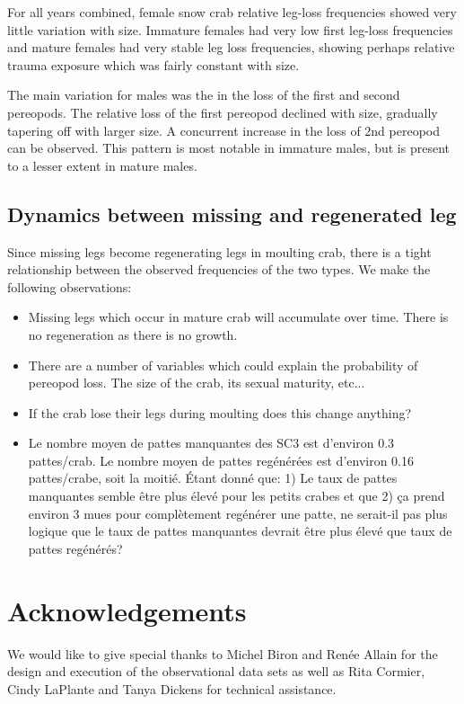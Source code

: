 \documentclass[letterpaper, 10pt]{article}
\begin{document}
For all years combined, female snow crab relative leg-loss frequencies showed very little variation with size. Immature females had very low first leg-loss frequencies and mature females had very stable leg loss frequencies, showing perhaps relative trauma exposure which was fairly constant with size.

The main variation for males was the in the loss of the first and second pereopods. The relative loss of the first pereopod declined with size, gradually tapering off with larger size. A concurrent increase in the loss of 2nd pereopod can be observed. This pattern is most notable in immature males, but is present to a lesser extent in mature males.

\subsection{Dynamics between missing and regenerated leg}

Since missing legs become regenerating legs in moulting crab, there is a tight relationship between the observed frequencies of the two types. We make the following observations:

\begin{itemize}
   \item Missing legs which occur in mature crab will accumulate over time. There is no regeneration 
         as there is no growth.
   \item There are a number of variables which could explain the probability of pereopod loss. The 
         size of the crab, its sexual maturity, etc...
   \item If the crab lose their legs during moulting does this change anything?
   \item Le nombre moyen de pattes manquantes des SC3 est d'environ 0.3 pattes/crab. Le nombre moyen 
         de pattes regénérées est d'environ 0.16 pattes/crabe, soit la moitié. Étant donné que: 1) Le
         taux de pattes manquantes semble être plus élevé pour les petits crabes et que 2) ça prend
         environ 3 mues pour complètement regénérer une patte, ne serait-il pas plus logique que le
         taux de pattes manquantes devrait être plus élevé que taux de pattes regénérés?
\end{itemize}

\newpage

\section{Acknowledgements}
We would like to give special thanks to Michel Biron and Renée Allain for the design and execution of the observational data sets as well as Rita Cormier, Cindy LaPlante and Tanya Dickens for technical assistance.   
\end{document}
